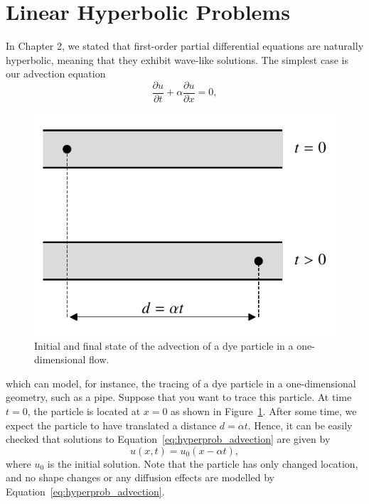\section{Linear Hyperbolic Problems} \label{sec:linear_hyperb_problems}
In Chapter 2, we stated that first-order partial differential equations are naturally hyperbolic, meaning that they exhibit wave-like solutions. The simplest case is our advection equation
\begin{equation}
	\frac{\partial u}{\partial t} + \alpha \frac{\partial u}{\partial x} = 0, 
	\label{eq:hyperprob_advection}
\end{equation}
\begin{figure}[htbp]
	\centering
	\includegraphics[width=0.5\linewidth]{Pictures/ch11_lsc_advection_dye}
	\caption{Initial and final state of the advection of a dye particle in a one-dimensional flow.}
	\label{fig:advection_dye}
\end{figure}
which can model, for instance, the tracing of a dye particle in a one-dimensional geometry, such as a pipe. Suppose that you want to trace this particle. At time $t=0$, the particle is located at $x=0$ as shown in Figure~\ref{fig:advection_dye}. After some time, we expect the particle to have translated a distance $d=\alpha t$. Hence, it can be easily checked that solutions to Equation~\ref{eq:hyperprob_advection} are given by
\begin{equation}
	u(x,t) = u_0 (x - \alpha t), 
\end{equation}
where $u_0$ is the initial solution. Note that the particle has only changed location, and no shape changes or any diffusion effects are modelled by Equation~\ref{eq:hyperprob_advection}.

